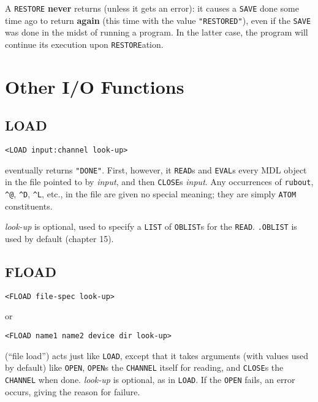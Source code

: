 \documentclass[a4paper]{scrbook}
\begin{document}
A \texttt{RESTORE} \textbf{never} returns (unless it gets an error): it causes a \texttt{SAVE} done some time ago to return
\textbf{again} (this time with the value \texttt{"RESTORED"}), even if the \texttt{SAVE} was done in the midst of running a
program. In the latter case, the program will continue its execution upon \texttt{RESTORE}ation.

\section{Other I/O Functions}\label{other-io-functions}

\subsection{LOAD}\label{load}

\begin{verbatim}
<LOAD input:channel look-up>
\end{verbatim}

 eventually returns \texttt{"DONE"}. First, however, it \texttt{READ}s and \texttt{EVAL}s every
MDL object in the file pointed to by \emph{input}, and then \texttt{CLOSE}s \emph{input}. Any occurrences of
\texttt{rubout}, \texttt{\^{}@}, \texttt{\^{}D}, \texttt{\^{}L}, etc., in the file are given no special meaning; they are
simply \texttt{ATOM} constituents.

\emph{look-up} is optional, used to specify a \texttt{LIST} of \texttt{OBLIST}s for the \texttt{READ}. \texttt{.OBLIST} is
used by default (chapter 15).

\subsection{FLOAD}\label{fload}

\begin{verbatim}
<FLOAD file-spec look-up>
\end{verbatim}

or

\begin{verbatim}
<FLOAD name1 name2 device dir look-up>
\end{verbatim}

 (``file load'') acts just like \texttt{LOAD}, except that it takes arguments (with values
used by default) like \texttt{OPEN}, \texttt{OPEN}s the \texttt{CHANNEL} itself for reading, and \texttt{CLOSE}s the
\texttt{CHANNEL} when done. \emph{look-up} is optional, as in \texttt{LOAD}. If the \texttt{OPEN} fails, an error occurs,
giving the reason for failure.
\end{document}
